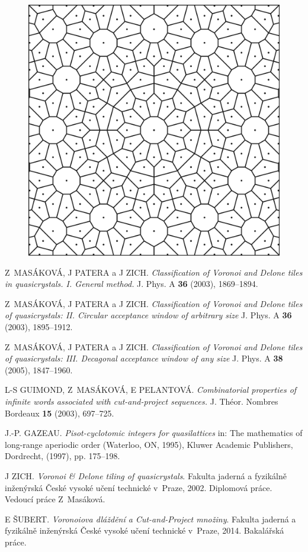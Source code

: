 \documentclass[a4paper,10pt,twoside]{article}
\theoremstyle{definition}
\theoremstyle{remark}
\begin{document}
\begin{figure}[h!]
\centering
\includegraphics[width=\textwidth]{dodecagon}
\end{figure}

\clearpage
\begin{thebibliography}{9}

	Z~MASÁKOVÁ, J PATERA a J ZICH. \emph{Classification of Voronoi and Delone tiles in quasicrystals. I. General method.} J. Phys. A \textbf{36} (2003), 1869--1894.

	Z~MASÁKOVÁ, J PATERA a J ZICH. \emph{Classification of Voronoi and Delone tiles of quasicrystals: II. Circular acceptance window of arbitrary size} J. Phys. A \textbf{36} (2003), 1895--1912.

	Z~MASÁKOVÁ, J PATERA a J ZICH. \emph{Classification of Voronoi and Delone tiles of quasicrystals: III. Decagonal acceptance window of any size} J. Phys. A \textbf{38} (2005), 1847--1960.
  
	L-S GUIMOND, Z~MASÁKOVÁ, E PELANTOVÁ. \emph{Combinatorial properties of infinite words associated with cut-and-project
 sequences.} J. Théor. Nombres Bordeaux \textbf{15} (2003), 697--725.

	J.-P. GAZEAU. \emph{Pisot-cyclotomic integers for quasilattices} in: The mathematics of long-range aperiodic order (Waterloo, ON, 1995), Kluwer Academic Publishers, Dordrecht, (1997), pp. 175–198.
  
	J ZICH. \emph{Voronoi \& Delone tiling of quasicrystals}. Fakulta jaderná a fyzikálně inženýrská České vysoké učení technické v~Praze, 2002. Diplomová práce. Vedoucí práce Z~Masáková.

	E ŠUBERT. \emph{Voronoiova dláždění a Cut-and-Project množiny}. Fakulta jaderná a fyzikálně inženýrská České vysoké učení technické v~Praze, 2014. Bakalářská práce.
	
\end{thebibliography}
\end{document}
